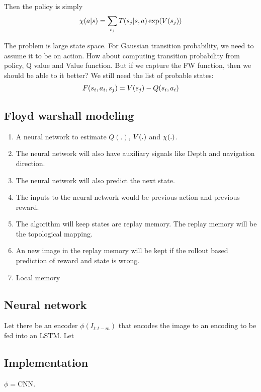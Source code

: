 Then the policy is simply
\begin{align}
  \chi(a | s) =
  \sum_{s_j}T(s_{j} | s, a)
  \exp(V(s_j))
\end{align}

The problem is large state space. For Gaussian transition probability,
we need to assume it to be on action.
How about computing transition probability from policy, Q value and Value function.
But if we capture the FW function, then we should be able to it better?
We still need the list of probable states:
\begin{align}
  F(s_i, a_i, s_j) = V(s_j) - Q(s_i, a_i)
\end{align}

\subsection{Floyd warshall modeling}
\begin{enumerate}
\item A neural network to estimate $Q(.)$, $V(.)$ and $\chi(.)$.
\item The neural network will also have auxiliary signals like Depth
  and navigation direction.
\item The neural network will also predict the next state.
\item The inputs to the neural network would be previous action and previous reward.
\item The algorithm will keep states are replay memory. The replay
  memory will be the topological mapping.
\item An new image in the replay memory will be kept if the rollout
  based prediction of reward and state is wrong.
\item Local memory
\end{enumerate}


\subsection{Neural network}

Let there be an encoder $\phi(I_{t:t-m})$ that encodes the image to an
encoding to be fed into an LSTM.
Let 


\subsection{Implementation}

$\phi = \text{CNN}$.
